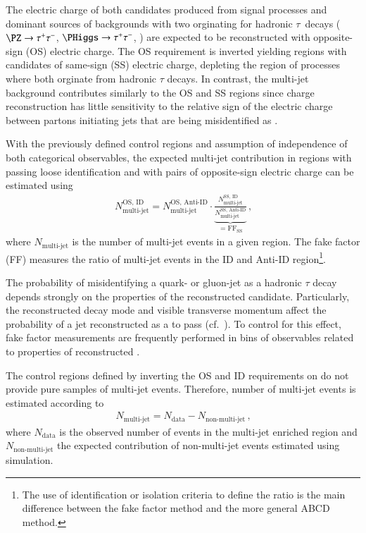 The electric charge of both \tauhadvis candidates produced from signal
processes and dominant sources of backgrounds with two \tauhadvis
orginating for hadronic $\tau$~decays ($\PZ \to \tautau$,
$\PHiggs \to \tautau$, \ttbar) are expected to be reconstructed with
opposite-sign (OS) electric charge. The OS requirement is inverted
yielding regions with \tauhadvis candidates of same-sign (SS) electric
charge, depleting the region of processes where both \tauhadvis
orginate from hadronic $\tau$ decays. In contrast, the multi-jet
background contributes similarly to the OS and SS regions since
\tauhadvis charge reconstruction has little sensitivity to the
relative sign of the electric charge between partons initiating jets
that are being misidentified as \tauhadvis.

With the previously defined control regions and assumption of
independence of both categorical observables, the expected multi-jet
contribution in regions with \tauhadvis passing loose identification
and with \tauhadvis pairs of opposite-sign electric charge can be
estimated using
\begin{align*}
  N_\text{multi-jet}^{\text{OS, ID}} =
  N_\text{multi-jet}^{\text{OS, Anti-ID}}
  \cdot
  \underbrace{\frac{N_\text{multi-jet}^{\text{SS, ID}}}
  {N_\text{multi-jet}^{\text{SS, Anti-ID}}}}
  _{= \text{FF}_\text{SS}} \,\text{,}
\end{align*}
where $N_\text{multi-jet}$ is the number of multi-jet events in a
given region. The fake factor (FF) measures the ratio of multi-jet
events in the ID and Anti-ID region\footnote{The use of identification
  or isolation criteria to define the ratio is the main difference
  between the fake factor method and the more general ABCD method.}.

The probability of misidentifying a quark- or gluon-jet as a hadronic
$\tau$ decay depends strongly on the properties of the reconstructed
\tauhadvis candidate. Particularly, the reconstructed decay mode and
visible transverse momentum affect the probability of a jet
reconstructed as a \tauhadvis to pass \tauid (cf.\
). To control for this effect, fake factor
measurements are frequently performed in bins of observables related
to properties of reconstructed \tauhadvis.

The control regions defined by inverting the OS and ID requirements on
\tauhadvis do not provide pure samples of multi-jet events. Therefore,
number of multi-jet events is estimated according to
\begin{align*}
  N_\text{multi-jet} = N_\text{data} - N_\text{non-multi-jet} \,\text{,}
\end{align*}
where $N_\text{data}$ is the observed number of events in the
multi-jet enriched region and $N_\text{non-multi-jet}$ the expected
contribution of non-multi-jet events estimated using simulation.

